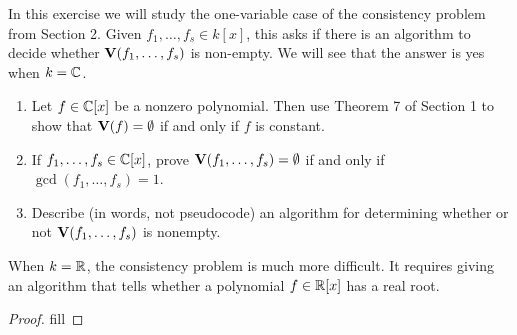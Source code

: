 \begin{exercise}{11}
In this exercise we will study the one-variable case of the consistency problem from Section 2. Given $f_1,\dots,f_s\in k[x]$, this asks if there is an algorithm to decide whether $\mathbf{V}(f_1,\dots,f_s)$ is non-empty. We will see that the answer is yes when $k=\mathbb{C}$.
\begin{enumerate}
    \item Let $f\in\mathbb{C}[x]$ be a nonzero polynomial. Then use Theorem 7 of Section 1 to show that $\mathbf{V}(f) =\emptyset$ if and only if $f$ is constant.
    \item If $f_1,\dots,f_s\in\mathbb{C}[x]$, prove $\mathbf{V}(f_1,\dots,f_s) =\emptyset$ if and only if $\gcd(f_1,\dots,f_s) =1$.
    \item Describe (in words, not pseudocode) an algorithm for determining whether or not $\mathbf{V}(f_1,\dots,f_s)$ is nonempty.
\end{enumerate}
When $k=\mathbb{R}$, the consistency problem is much more difficult. It requires giving an algorithm that tells whether a polynomial $f\in\mathbb{R}[x]$ has a real root.
\end{exercise}
\begin{proof}
fill
\end{proof}

